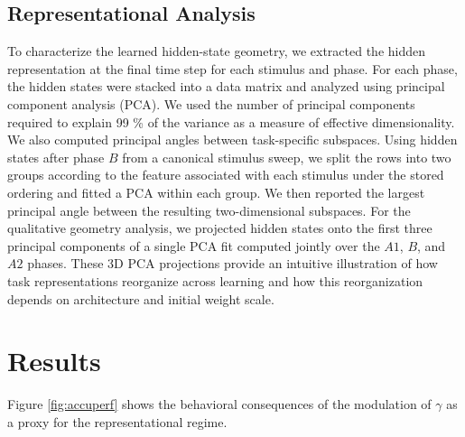 \documentclass[letterpaper]{article}
\begin{document}
        \subsection{Representational Analysis}
        
        To characterize the learned hidden-state geometry, we extracted the hidden representation at the final time step for each stimulus and phase. For each phase, the hidden states were stacked into a data matrix and analyzed using principal component analysis (PCA). We used the number of principal components required to explain 99 \% of the variance as a measure of effective dimensionality. We also computed principal angles between task-specific subspaces. Using hidden states after phase \(B\) from a canonical stimulus sweep, we split the rows into two groups according to the feature associated with each stimulus under the stored ordering and fitted a PCA within each group. We then reported the largest principal angle between the resulting two-dimensional subspaces. For the qualitative geometry analysis, we projected hidden states onto the first three principal components of a single PCA fit computed jointly over the \(A1\), \(B\), and \(A2\) phases. These 3D PCA projections provide an intuitive illustration of how task representations reorganize across learning and how this reorganization depends on architecture and initial weight scale.
    
\section{Results}

        Figure \ref{fig:accuperf} shows the behavioral consequences of the modulation of $\gamma$ as a proxy for the representational regime.
        
\end{document}
